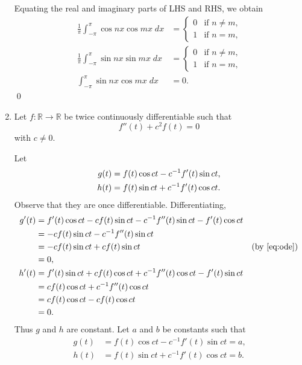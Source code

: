 \documentclass[oneside]{article}
\newcommand\bbR{\mathbb{R}}
\begin{document}
\begin{enumerate}[label=\textbf{\arabic*.}]
  Equating the real and imaginary parts of LHS and RHS, we obtain\begin{align*}
    \frac{1}{\pi}\int_{-\pi}^{\pi} \cos nx \cos mx\;dx &= \begin{cases}
      0 & \text{if }n \neq m \text{,} \\
      1 & \text{if }n = m \text{,}
    \end{cases} \\
    \frac{1}{\pi}\int_{-\pi}^{\pi} \sin nx \sin mx\;dx &= \begin{cases}
      0 & \text{if }n \neq m \text{,} \\
      1 & \text{if }n = m \text{,}
    \end{cases} \\
    \int_{-\pi}^{\pi} \sin nx \cos mx\;dx &= 0\text{.}
  \end{align*}\qed

  \item
  Let $f : \bbR \to \bbR$ be twice continuously differentiable such that
  \begin{equation}
    \label{eq:ode}
    f''(t) + c^2f(t) = 0
  \end{equation} with $c \neq 0$.

  Let\begin{align*}
    g(t) &= f(t)\cos ct - c^{-1} f'(t) \sin ct \text{,}\\
    h(t) &= f(t)\sin ct + c^{-1} f'(t) \cos ct \text.
  \end{align*} Observe that they are once differentiable. Differentiating,
  \begin{align*}
    g'(t)
    &= f'(t)\cos ct - cf(t)\sin ct - c^{-1} f''(t) \sin ct - f'(t) \cos ct \\
    &= - cf(t)\sin ct - c^{-1} f''(t) \sin ct \\
    &= - cf(t)\sin ct + c f(t) \sin ct & \text{(by \eqref{eq:ode})}\\
    &= 0 \text{,} \\
    h'(t)
    &= f'(t)\sin ct + cf(t)\cos ct + c^{-1} f''(t) \cos ct - f'(t) \sin ct \\
    &= cf(t)\cos ct + c^{-1} f''(t) \cos ct \\
    &= cf(t)\cos ct - cf(t) \cos ct \\
    &= 0 \text{.}
  \end{align*} Thus $g$ and $h$ are constant. Let $a$ and $b$ be constants such
  that \begin{align*}
    g(t) &= f(t)\cos ct - c^{-1} f'(t) \sin ct = a \text{,} \\
    h(t) &= f(t)\sin ct + c^{-1} f'(t) \cos ct = b \text{.}
  \end{align*}


\end{enumerate}
\end{document}
